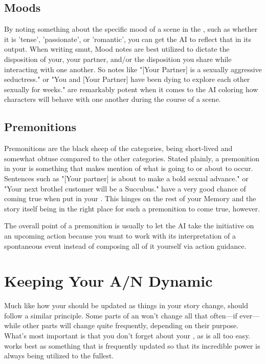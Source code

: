 ﻿\documentclass[Coomer-main.tex]{subfiles}
\begin{document}
\subsection{Moods}

By noting something about the specific mood of a scene in the \an, such as whether it is 'tense', 'passionate', or 'romantic', you can get the AI to reflect that in its output. When writing smut, Mood notes are best utilized to dictate the disposition of your, your partner, and/or the disposition you share while interacting with one another. So notes like "[Your Partner] is a sexually aggressive seductress." or "You and [Your Partner] have been dying to explore each other sexually for weeks." are remarkably potent when it comes to the AI coloring how characters will behave with one another during the course of a scene.

\subsection{Premonitions}

Premonitions are the black sheep of the \an categories, being short-lived and somewhat obtuse compared to the other categories. Stated plainly, a premonition in your \an is something that makes mention of what is going to or about to occur. Sentences such as "[Your partner] is about to make a bold sexual advance." or "Your next brothel customer will be a Succubus." have a very good chance of coming true when put in your \an. This hinges on the rest of your Memory and the story itself being in the right place for such a premonition to come true, however.

The overall point of a premonition is usually to let the AI take the initiative on an upcoming action because you want to work with its interpretation of a spontaneous event instead of composing all of it yourself via action guidance.

\section{Keeping Your A/N Dynamic}

Much like how your \rem should be updated as things in your story change, \an should follow a similar principle. Some parts of an \an won't change all that often—if ever—while other parts will change quite frequently, depending on their purpose. What's most important is that you don't forget about your \an, as is all too easy. \an works best as something that is frequently updated so that its incredible power is always being utilized to the fullest.
\end{document}
